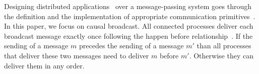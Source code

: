

Designing distributed
applications~\cite{demers1987epidemic,nakamoto2009bitcoin,nedelec2016crate,shapiro2011comprehensive}
over a message-passing system goes through the definition and the implementation
of appropriate communication primitives~\cite{hadzilacos1994modular}.  In this
paper, we focus on causal broadcast.
All connected processes deliver each broadcast message exactly once following
the happen before relationship~\cite{lamport1978time,schwarz1994detecting}. If
the sending of a message $m$ precedes the sending of a message $m'$ than all
processes that deliver these two messages need to deliver $m$ before
$m'$. Otherwise they can deliver them in any order.


